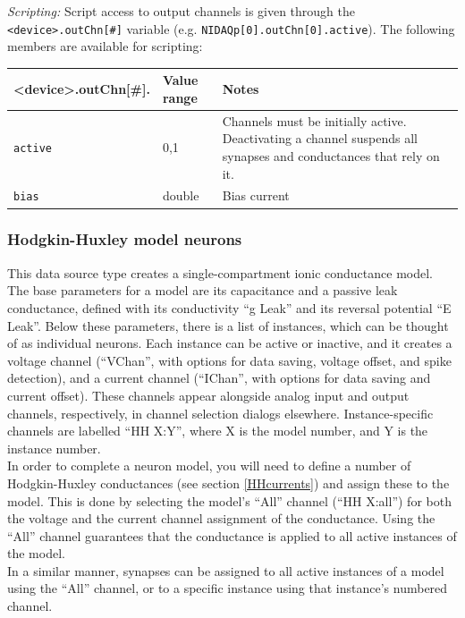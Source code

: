\documentclass{article}
\begin{document}
\noindent
\emph{Scripting:} Script access to output channels is given through the \texttt{<device>.outChn[\#]} variable
(e.g. \texttt{NIDAQp[0].outChn[0].active}).
The following members are available for scripting: \\
\begin{tabularx}{\linewidth}{|ll|X|}
	\hline
	{\bf \textless{}device\textgreater.outChn[\#].\textvisiblespace} & {\bf Value range} & {\bf Notes} \\
	\hline
	\texttt{active} & 0,1 & Channels must be initially active. Deactivating a channel suspends all
	synapses and conductances that rely on it. \\
	\texttt{bias} & double & Bias current \\
	\hline
\end{tabularx}


\subsubsection{Hodgkin-Huxley model neurons} \label{HHmodels}

This data source type creates a single-compartment ionic conductance model.
The base parameters for a model are its capacitance and a passive leak conductance,
defined with its conductivity ``g Leak'' and its reversal potential ``E Leak''.
Below these parameters, there is a list of instances, which can be thought of as
individual neurons. Each instance can be active or inactive, and it creates a voltage
channel (``VChan'', with options for data saving, voltage offset, and spike detection),
and a current channel (``IChan'', with options for data saving and current offset).
These channels appear alongside analog input and output channels, respectively, in
channel selection dialogs elsewhere. Instance-specific channels are labelled ``HH X:Y'',
where X is the model number, and Y is the instance number. \\
In order to complete a neuron model, you will need to define a number of Hodgkin-Huxley
conductances (see section \ref{HHcurrents}) and assign these to the model. This is done
by selecting the model's ``All'' channel (``HH X:all'') for both the voltage and the current channel
assignment of the conductance. Using the ``All'' channel guarantees that the conductance
is applied to all active instances of the model. \\
In a similar manner, synapses can be assigned to all active instances of a model
using the ``All'' channel, or to a specific instance using that instance's numbered
channel.
\end{document}
